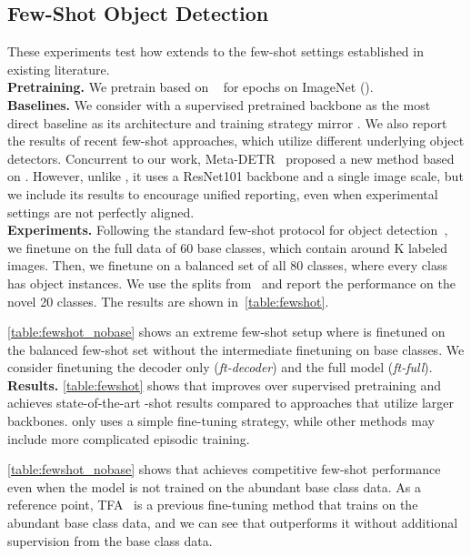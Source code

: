 \subsection{Few-Shot Object Detection}
These experiments test how \model extends to the few-shot settings established in existing literature.
\vspace{0.1cm}
\\
\noindent\textbf{Pretraining.} We pretrain \model based on ~\cite{zhu2020deformable} for  epochs on ImageNet (\imagenetthousand). 
\\
\noindent\textbf{Baselines.} We consider  with a supervised pretrained backbone as the most direct baseline as its architecture and training strategy mirror \model. We also report the results of recent few-shot approaches, which utilize different underlying object detectors. Concurrent to our work, Meta-DETR~\cite{zhang2021meta} proposed a new method based on . However, unlike \model, it uses a ResNet101 backbone and a single image scale, but we include its results to encourage unified reporting, even when experimental settings are not perfectly aligned.
\vspace{0.1cm}
\\
\noindent\textbf{Experiments.} Following the standard few-shot protocol for object detection~\cite{wang2020frustratingly}, we finetune \model on the full data of 60 base classes, which contain around K labeled images. Then, we finetune on a balanced set of all 80 classes, where every class has  object instances. We use the splits from~\cite{wang2020frustratingly} and report the performance on the novel 20 classes. The results are shown in~\cref{table:fewshot}.

\cref{table:fewshot_nobase} shows an extreme few-shot setup where \model is finetuned on the balanced few-shot set without the intermediate finetuning on base classes. We consider finetuning the decoder only (\textit{ft-decoder}) and the full model (\textit{ft-full}). \vspace{0.1cm}
\\
\noindent\textbf{Results.} \cref{table:fewshot} shows that \model improves over supervised pretraining and achieves state-of-the-art -shot results compared to approaches that utilize larger backbones. \model only uses a simple fine-tuning strategy, while other methods may include more complicated episodic training. 

\cref{table:fewshot_nobase} shows that \model achieves competitive few-shot performance even when the model is not trained on the abundant base class data. As a reference point, TFA~\cite{wang2020frustratingly} is a previous fine-tuning method that trains on the abundant base class data, and we can see that \model outperforms it without additional supervision from the base class data. 



